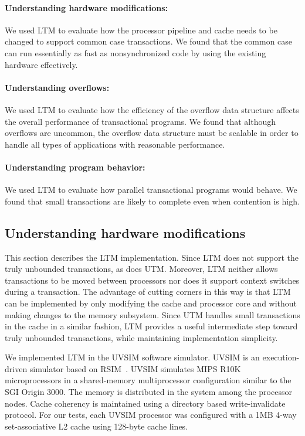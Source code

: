 \paragraph{Understanding hardware modifications:}
We used LTM to evaluate how the processor pipeline and cache needs to
be changed to support common case transactions. We found that the
common case can run essentially as fast as nonsynchronized code by
using the existing hardware effectively.

\paragraph{Understanding overflows:}
We used LTM to evaluate how the efficiency of the overflow data
structure affects the overall performance of transactional
programs. We found that although overflows are uncommon, the overflow
data structure must be scalable in order to handle all types of
applications with reasonable performance.

\paragraph{Understanding program behavior:}
We used LTM to evaluate how parallel transactional programs would
behave. We found that small transactions are likely to complete even
when contention is high.

\subsection{Understanding hardware modifications}

This section describes the LTM implementation.  Since LTM does not
support the truly unbounded transactions, as does UTM\@.  Moreover,
LTM neither allows transactions to be moved between processors nor
does it support context switches during a transaction.  The advantage
of cutting corners in this way is that LTM can be implemented by only
modifying the cache and processor core and without making changes to
the memory subsystem.  Since UTM handles small transactions in the
cache in a similar fashion, LTM provides a useful intermediate step
toward truly unbounded transactions, while maintaining implementation
simplicity.

We implemented LTM in the UVSIM software simulator. UVSIM is an
execution-driven simulator based on RSIM~\cite{PaiRaAd97}.  UVSIM
simulates MIPS R10K~\cite{MIPSR10K} microprocessors in a shared-memory
multiprocessor configuration similar to the SGI Origin 3000.  The
memory is distributed in the system among the processor nodes. Cache
coherency is maintained using a directory based write-invalidate
protocol. For our tests, each UVSIM processor was configured with a
1MB 4-way set-associative L2 cache using 128-byte cache lines.


